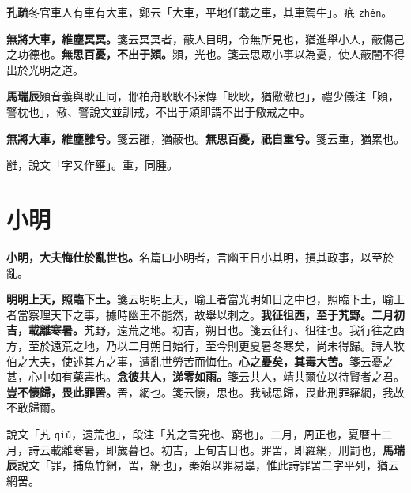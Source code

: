 \begin{quoting}\textbf{孔疏}冬官車人有車有大車，鄭云「大車，平地任載之車，其車駕牛」。疧 \texttt{zhěn}。\end{quoting}

\textbf{無將大車，維塵冥冥。}{\footnotesize 箋云冥冥者，蔽人目明，令無所見也，猶進舉小人，蔽傷己之功德也。}\textbf{無思百憂，不出于熲。}{\footnotesize 熲，光也。箋云思眾小事以為憂，使人蔽闇不得出於光明之道。}

\begin{quoting}\textbf{馬瑞辰}熲音義與耿正同，邶柏舟耿耿不寐傳「耿耿，猶儆儆也」，禮少儀注「熲，警枕也」，儆、警說文並訓戒，不出于熲即謂不出于儆戒之中。\end{quoting}

\textbf{無將大車，維塵雝兮。}{\footnotesize 箋云雝，猶蔽也。}\textbf{無思百憂，祇自重兮。}{\footnotesize 箋云重，猶累也。}

\begin{quoting}雝，說文「字又作壅」。重，同腫。\end{quoting}

\section{小明}


\textbf{小明，大夫悔仕於亂世也。}{\footnotesize 名篇曰小明者，言幽王日小其明，損其政事，以至於亂。}

\textbf{明明上天，照臨下土。}{\footnotesize 箋云明明上天，喻王者當光明如日之中也，照臨下土，喻王者當察理天下之事，據時幽王不能然，故舉以刺之。}\textbf{我征徂西，至于艽野。二月初吉，載離寒暑。}{\footnotesize 艽野，遠荒之地。初吉，朔日也。箋云征行、徂往也。我行往之西方，至於遠荒之地，乃以二月朔日始行，至今則更夏暑冬寒矣，尚未得歸。詩人牧伯之大夫，使述其方之事，遭亂世勞苦而悔仕。}\textbf{心之憂矣，其毒大苦。}{\footnotesize 箋云憂之甚，心中如有藥毒也。}\textbf{念彼共人，涕零如雨。}{\footnotesize 箋云共人，靖共爾位以待賢者之君。}\textbf{豈不懷歸，畏此罪罟。}{\footnotesize 罟，網也。箋云懷，思也。我誠思歸，畏此刑罪羅網，我故不敢歸爾。}

\begin{quoting}說文「艽 \texttt{qiǔ}，遠荒也」，段注「艽之言究也、窮也」。二月，周正也，夏曆十二月，詩云載離寒暑，即歲暮也。初吉，上旬吉日也。罪罟，即羅網，刑罰也，\textbf{馬瑞辰}說文「罪，捕魚竹網，罟，網也」，秦始以罪易辠，惟此詩罪罟二字平列，猶云網罟。\end{quoting}

